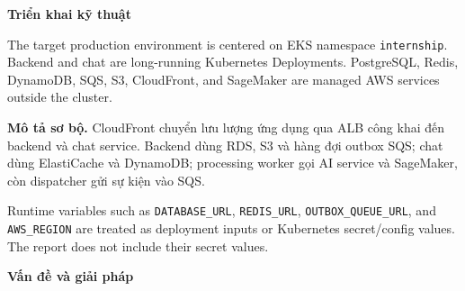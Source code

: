 \vspace{0.5em}\noindent\textbf{Triển khai kỹ
thuật}\par

The target production environment is centered on EKS namespace
\texttt{internship}. Backend and chat are long-running Kubernetes
Deployments. PostgreSQL, Redis, DynamoDB, SQS, S3, CloudFront, and
SageMaker are managed AWS services outside the cluster.

\textbf{Mô tả sơ bộ.} CloudFront chuyển lưu lượng ứng dụng qua ALB công
khai đến backend và chat service. Backend dùng RDS, S3 và hàng đợi
outbox SQS; chat dùng ElastiCache và DynamoDB; processing worker gọi AI
service và SageMaker, còn dispatcher gửi sự kiện vào SQS.

Runtime variables such as \texttt{DATABASE\_\allowbreak{}URL}, \texttt{REDIS\_\allowbreak{}URL},
\texttt{OUTBOX\_\allowbreak{}QUEUE\_\allowbreak{}URL}, and \texttt{AWS\_\allowbreak{}REGION} are treated as
deployment inputs or Kubernetes secret/config values. The report does
not include their secret values.

\vspace{0.5em}\noindent\textbf{Vấn đề và giải
pháp}\par

